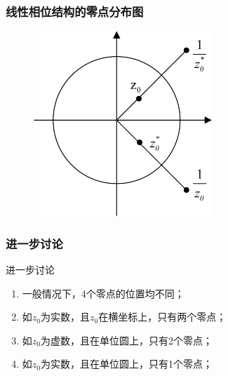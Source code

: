 \documentclass[notheorems,compress,mathserif,table]{beamer}
\begin{document}
\begin{frame}\frametitle{线性相位结构的零点分布图}%
\begin{figure}[h]
\centering
\includegraphics[width=0.6\textwidth]{xxxwldsyt.jpg}
\end{figure}
\end{frame}
\begin{frame}\frametitle{进一步讨论}%
进一步讨论
\begin{enumerate}
\item 一般情况下，4个零点的位置均不同；
\item 如$z_0$为实数，且$z_0$在横坐标上，只有两个零点；
\item 如$z_0$为虚数，且在单位圆上，只有2个零点；
\item 如$z_0$为实数，且在单位圆上，只有1个零点；
\end{enumerate}
\end{frame}
\end{document}
